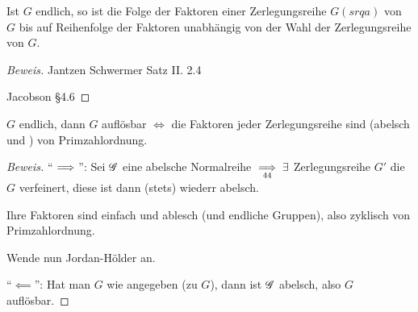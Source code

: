 \documentclass[a4paper]{report}
\begin{document}
\begin{satz}
Ist $G$ endlich, so ist die Folge der Faktoren einer Zerlegungsreihe $G(srqa)$ von $G$ bis auf Reihenfolge der Faktoren unabhängig von der Wahl der Zerlegungsreihe von $G$.
\end{satz}
\begin{proof}[Beweis] %
  \item Jantzen Schwermer Satz II. 2.4
  \item Jacobson §4.6
\end{proof}
\begin{kor} %
$G$ endlich, dann $G$ auflösbar $\iff$ die Faktoren jeder Zerlegungsreihe sind (abelsch und ) von Primzahlordnung.
\end{kor}
\begin{proof}[Beweis]
  \item ``$\implies$'': Sei $\mathscr{G}$ eine abelsche Normalreihe
  \(\underset{44} {\implies} \exists \) Zerlegungsreihe $G'$ die $G$ verfeinert, diese ist dann (stets) wiederr abelsch.

  Ihre Faktoren sind einfach und ablesch (und endliche Gruppen), also zyklisch von Primzahlordnung.

  Wende nun Jordan-Hölder an.

\item ``$\impliedby$'': Hat man $G$ wie angegeben (zu $G$), dann ist $\mathscr{G}$ abelsch, also $G$ auflösbar.
\end{proof}
\end{document}
